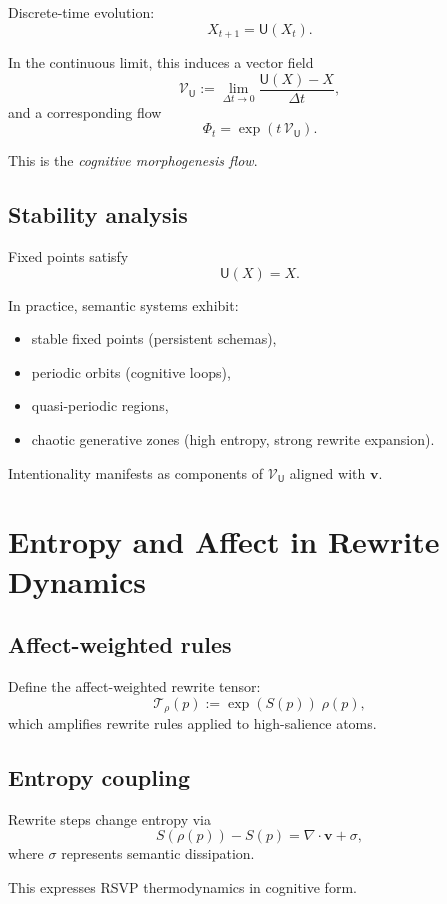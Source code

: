 Discrete-time evolution:
\[
X_{t+1} = \mathsf{U}(X_t).
\]

In the continuous limit, this induces a vector field
\[
\mathcal{V}_{\mathsf{U}} := \lim_{\Delta t\to 0}
\frac{\mathsf{U}(X)-X}{\Delta t},
\]
and a corresponding flow
\[
\Phi_t = \exp(t\,\mathcal{V}_{\mathsf{U}}).
\]

This is the \emph{cognitive morphogenesis flow}.

\subsection{Stability analysis}

Fixed points satisfy
\[
\mathsf{U}(X)=X.
\]

In practice, semantic systems exhibit:
\begin{itemize}
  \item stable fixed points (persistent schemas),
  \item periodic orbits (cognitive loops),
  \item quasi-periodic regions,
  \item chaotic generative zones (high entropy, strong rewrite expansion).
\end{itemize}

Intentionality manifests as components of $\mathcal{V}_{\mathsf{U}}$
aligned with $\mathbf{v}$.

\section{Entropy and Affect in Rewrite Dynamics}

\subsection{Affect-weighted rules}

Define the affect-weighted rewrite tensor:
\[
\mathcal{T}_{\rho}(p) := \exp(S(p))\;\rho(p),
\]
which amplifies rewrite rules applied to high-salience atoms.

\subsection{Entropy coupling}

Rewrite steps change entropy via
\[
S(\rho(p)) - S(p)
= \nabla\cdot\mathbf{v} + \sigma,
\]
where $\sigma$ represents semantic dissipation.

This expresses RSVP thermodynamics in cognitive form.

